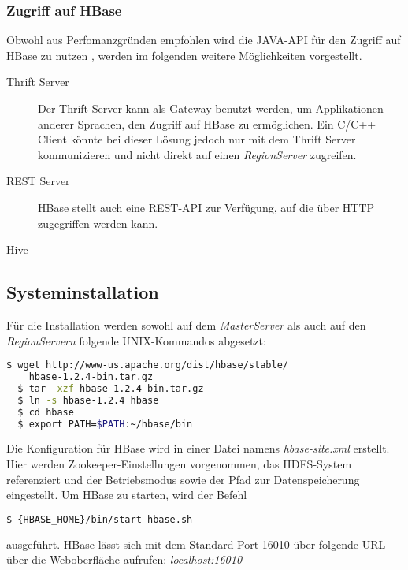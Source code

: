 \subsubsection{Zugriff auf HBase}
Obwohl aus Perfomanzgründen empfohlen wird die JAVA-API für den Zugriff auf HBase zu nutzen \cite{clo11}, werden im folgenden weitere Möglichkeiten vorgestellt.
\begin{description}
\item[Thrift Server]
Der Thrift Server kann als Gateway benutzt werden, um Applikationen  anderer Sprachen, den Zugriff auf HBase zu ermöglichen. Ein C/C++ Client könnte bei dieser Lösung jedoch nur mit dem Thrift Server kommunizieren und nicht direkt auf einen \textit{RegionServer} zugreifen.

\item[REST Server]
HBase stellt auch eine REST-API zur Verfügung, auf die über HTTP zugegriffen werden kann.

\item[Hive]
\end{description}


\subsection{Systeminstallation} %
Für die Installation werden sowohl auf dem  \textit{MasterServer} als auch auf den \textit{RegionServern} folgende UNIX-Kommandos abgesetzt:
\noindent 
\begin{lstlisting}[language=bash]
  $ wget http://www-us.apache.org/dist/hbase/stable/
    hbase-1.2.4-bin.tar.gz
  $ tar -xzf hbase-1.2.4-bin.tar.gz
  $ ln -s hbase-1.2.4 hbase
  $ cd hbase
  $ export PATH=$PATH:~/hbase/bin
\end{lstlisting}

Die Konfiguration für HBase wird in einer Datei namens \textit{hbase-site.xml} erstellt. Hier werden Zookeeper-Einstellungen vorgenommen, das HDFS-System referenziert und der Betriebsmodus sowie der Pfad zur Datenspeicherung eingestellt.
Um HBase zu starten, wird der Befehl 
\noindent 
\begin{lstlisting}[language=bash]
  $ {HBASE_HOME}/bin/start-hbase.sh 
\end{lstlisting}
ausgeführt. HBase lässt sich mit dem Standard-Port 16010 über folgende \ac{URL} über die Weboberfläche aufrufen: \textit{localhost:16010}

